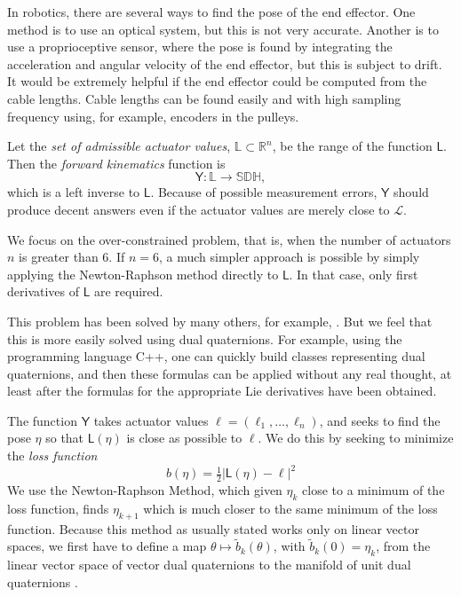 \documentclass[reqno,12pt]{amsart}
\newcommand\setunitdualquat{\mathbb S\mathbb D\mathbb H}
\begin{document}
In robotics, there are several ways to find the pose of the end effector.  One method is to use an optical system, but this is not very accurate.  Another is to use a proprioceptive sensor, where the pose is found by integrating the acceleration and angular velocity of the end effector, but this is subject to drift.  It would be extremely helpful if the end effector could be computed from the cable lengths.  Cable lengths can be found easily and with high sampling frequency using, for example, encoders in the pulleys.

Let the \emph{set of admissible actuator values}, $\mathbb L \subset \mathbb R^n$, be the range of the function $\mathsf L$.  Then the \emph{forward kinematics} function is
\begin{equation}
\mathsf Y : \mathbb L \to \setunitdualquat,
\end{equation}
 which is a left inverse to $\mathsf L$.  Because of possible measurement errors, $\mathsf Y$ should produce decent answers even if the actuator values are merely close to $\mathcal L$.  

We focus on the over-constrained problem, that is, when the number of actuators $n$ is greater than $6$.  If $n = 6$, a much simpler approach is possible by simply applying the Newton-Raphson method directly to $\mathsf L$.  In that case, only first derivatives of $\mathsf L$ are required.

This problem has been solved by many others, for example, \cite{pott-schmidt,yang-et-al}.  But we feel that this is more easily solved using dual quaternions.  For example, using the programming language C++, one can quickly build classes representing dual quaternions, and then these formulas can be applied without any real thought, at least after the formulas for the appropriate Lie derivatives have been obtained.

The function $\mathsf Y$ takes actuator values $\bm\ell = (\ell_1,\dots,\ell_n)$, and seeks to find the pose $\eta$ so that $\mathsf L(\eta)$ is close as possible to $\bm\ell$.  We do this by seeking to minimize the \emph{loss function}
\begin{equation}
b(\eta) = \tfrac12 {|\mathsf L(\eta) - \bm\ell|}^2
\end{equation}
We use the Newton-Raphson Method, which given $\eta_k$ close to a minimum of the loss function, finds $\eta_{k+1}$ which is much closer to the same minimum of the loss function.  Because this method as usually stated works only on linear vector spaces, we first have to define a map $\theta\mapsto\tilde b_k(\theta)$, with $\tilde b_k(0) = \eta_k$, from the linear vector space of vector dual quaternions to the manifold of unit dual quaternions \cite{huper-trumpf}.
\end{document}
